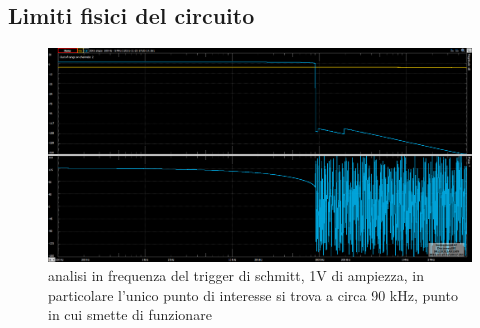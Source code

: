 \documentclass[10pt,a4paper]{article}
\begin{document}
\subsection{Limiti fisici del circuito}

\begin{figure}[htbp]
\centering
\includegraphics[scale=0.4]{bodeschmitt1V100Hz5MHz}
\caption{analisi in frequenza del trigger di schmitt, 1V di ampiezza, in particolare l'unico punto di interesse si trova a circa 90 kHz, punto in cui smette di funzionare}
\end{figure}
\end{document}
